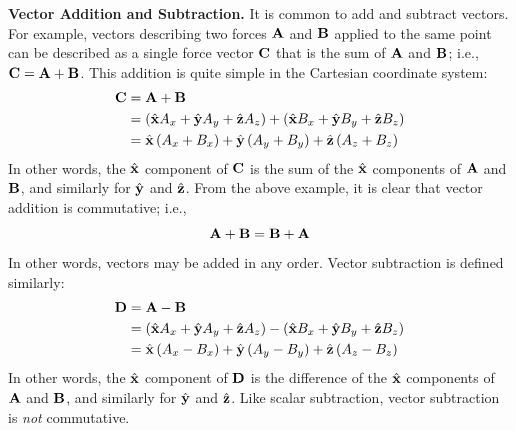 {\bf Vector Addition and Subtraction.}
It is common to add and subtract vectors.
For example, vectors describing two forces ${\bf A}$ and ${\bf B}$ applied to the same point can be described as a single force vector ${\bf C}$ that is the sum of ${\bf A}$ and ${\bf B}$; i.e., ${\bf C}={\bf A}+{\bf B}$.
This addition is quite simple in the Cartesian coordinate system:
%
\begin{equation}
\begin{split}
{\bf C} &= {\bf A}+{\bf B} \\
        &= \left(\hat{\bf x}A_x + \hat{\bf y}A_y + \hat{\bf z}A_z\right) + \left( \hat{\bf x}B_x + \hat{\bf y}B_y + \hat{\bf z}B_z \right) \\
        &= \hat{\bf x}\left(A_x+B_x\right) + \hat{\bf y}\left(A_y+B_y\right) + \hat{\bf z}\left(A_z+B_z\right) 
\end{split}
\end{equation}
%
In other words, the $\hat{\bf x}$ component of ${\bf C}$ is the sum of the $\hat{\bf x}$ components of ${\bf A}$ and ${\bf B}$, and similarly for $\hat{\bf y}$ and $\hat{\bf z}$.
From the above example, it is clear that vector addition is commutative; i.e., 
%
\begin{equation}
{\bf A}+{\bf B} = {\bf B}+{\bf A}
\end{equation}
%
In other words, vectors may be added in any order.
Vector subtraction is defined similarly:
%
\begin{equation}
\begin{split}
{\bf D} &= {\bf A}-{\bf B} \\
        &= \left(\hat{\bf x}A_x + \hat{\bf y}A_y + \hat{\bf z}A_z\right) - \left( \hat{\bf x}B_x + \hat{\bf y}B_y + \hat{\bf z}B_z \right) \\
        &= \hat{\bf x}\left(A_x-B_x\right) + \hat{\bf y}\left(A_y-B_y\right) + \hat{\bf z}\left(A_z-B_z\right) 
\end{split}
\end{equation}
%
In other words, the $\hat{\bf x}$ component of ${\bf D}$ is the difference of the $\hat{\bf x}$ components of ${\bf A}$ and ${\bf B}$, and similarly for $\hat{\bf y}$ and $\hat{\bf z}$.
Like scalar subtraction, vector subtraction is \emph{not} commutative.

